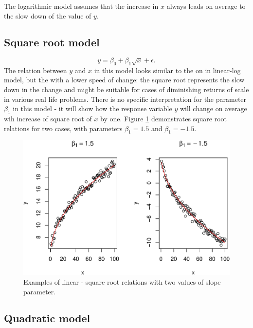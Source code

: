 \documentclass[
]{book}
\theoremstyle{definition}
\theoremstyle{definition}
\theoremstyle{definition}
\theoremstyle{definition}
\theoremstyle{remark}
\begin{document}
The logarithmic model assumes that the increase in \(x\) always leads on average to the slow down of the value of \(y\).

\hypertarget{square-root-model}{%
\subsection{Square root model}\label{square-root-model}}

\begin{equation}
    y = \beta_0 + \beta_1 \sqrt x + \epsilon .
    \label{eq:transformSqrt}
\end{equation}
The relation between \(y\) and \(x\) in this model looks similar to the on in linear-log model, but the with a lower speed of change: the square root represents the slow down in the change and might be suitable for cases of diminishing returns of scale in various real life problems. There is no specific interpretation for the parameter \(\beta_1\) in this model - it will show how the response variable \(y\) will change on average wih increase of square root of \(x\) by one. Figure \ref{fig:transformationsExamples04} demonstrates square root relations for two cases, with parameters \(\beta_1=1.5\) and \(\beta_1=-1.5\).

\begin{figure}
\centering
\includegraphics{Svetunkov---Statistics-for-Business-Analytics_files/figure-latex/transformationsExamples04-1.pdf}
\caption{\label{fig:transformationsExamples04}Examples of linear - square root relations with two values of slope parameter.}
\end{figure}

\hypertarget{quadratic-model}{%
\subsection{Quadratic model}\label{quadratic-model}}
\end{document}
